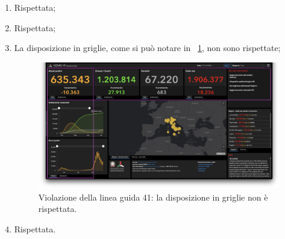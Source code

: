 \begin{enumerate}
    \item Rispettata;
    \item Rispettata;
    \item La disposizione in griglie, come si può notare in  ~\ref{fig:guidelines-violations-15}, non sono rispettate;
        \begin{figure}[H]
            \centering
            \includegraphics[width=0.5\columnwidth]{../../../assets/images/verifica-risorse-esistenti/guidelines_violations_17}
            \caption{Violazione della linea guida 41: la disposizione in griglie non è rispettata.}
            \label{fig:guidelines-violations-15}
        \end{figure}
    \item Rispettata.
\end{enumerate}
